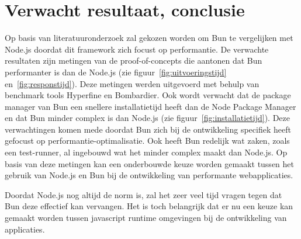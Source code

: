 \section{Verwacht resultaat, conclusie}%
\label{sec:verwachte_resultaten}
Op basis van literatuuronderzoek zal gekozen worden om Bun te vergelijken met Node.js doordat dit framework zich focust op performantie.
De verwachte resultaten zijn metingen van de proof-of-concepts die aantonen dat Bun performanter is dan de Node.js (zie figuur~\ref{fig:uitvoeringstijd} en~\ref{fig:responstijd}). 
Deze metingen werden uitgevoerd met behulp van benchmark tools Hyperfine en Bombardier.
Ook wordt verwacht dat de package manager van Bun een snellere installatietijd heeft dan de Node Package Manager en dat Bun minder complex is dan Node.js (zie figuur~\ref{fig:installatietijd}).
Deze verwachtingen komen mede doordat Bun zich bij de ontwikkeling specifiek heeft gefocust op performantie-optimalisatie.
Ook heeft Bun redelijk wat zaken, zoals een test-runner, al ingebouwd wat het minder complex maakt dan Node.js.
Op basis van deze metingen kan een onderbouwde keuze worden gemaakt tussen het gebruik van Node.js en Bun bij de ontwikkeling
van performante webapplicaties.

Doordat Node.js nog altijd de norm is, zal het zeer veel tijd vragen tegen dat Bun deze effectief kan vervangen.
Het is toch belangrijk dat er nu een keuze kan gemaakt worden tussen javascript runtime
omgevingen bij de ontwikkeling van applicaties.

